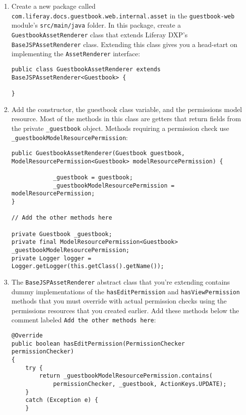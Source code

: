 \begin{enumerate}
\def\labelenumi{\arabic{enumi}.}
\item
  Create a new package called
  \texttt{com.liferay.docs.guestbook.web.internal.asset} in the
  \texttt{guestbook-web} module's \texttt{src/main/java} folder. In this
  package, create a \texttt{GuestbookAssetRenderer} class that extends
  Liferay DXP's \texttt{BaseJSPAssetRenderer} class. Extending this
  class gives you a head-start on implementing the
  \texttt{AssetRenderer} interface:

\begin{verbatim}
public class GuestbookAssetRenderer extends BaseJSPAssetRenderer<Guestbook> {

}
\end{verbatim}
\item
  Add the constructor, the guestbook class variable, and the permissions
  model resource. Most of the methods in this class are getters that
  return fields from the private \texttt{\_guestbook} object. Methods
  requiring a permission check use
  \texttt{\_guestbookModelResourcePermission}:

\begin{verbatim}
public GuestbookAssetRenderer(Guestbook guestbook, ModelResourcePermission<Guestbook> modelResourcePermission) {

            _guestbook = guestbook;
            _guestbookModelResourcePermission = modelResourcePermission;
}

// Add the other methods here

private Guestbook _guestbook;
private final ModelResourcePermission<Guestbook> _guestbookModelResourcePermission;   
private Logger logger = Logger.getLogger(this.getClass().getName());
\end{verbatim}
\item
  The \texttt{BaseJSPAssetRenderer} abstract class that you're extending
  contains dummy implementations of the \texttt{hasEditPermission} and
  \texttt{hasViewPermission} methods that you must override with actual
  permission checks using the permissions resources that you created
  earlier. Add these methods below the comment labeled
  \texttt{Add\ the\ other\ methods\ here}:

\begin{verbatim}
@Override
public boolean hasEditPermission(PermissionChecker permissionChecker) 
{
    try {
        return _guestbookModelResourcePermission.contains(
            permissionChecker, _guestbook, ActionKeys.UPDATE);
    }
    catch (Exception e) {
    }


\end{verbatim}
\end{enumerate}
